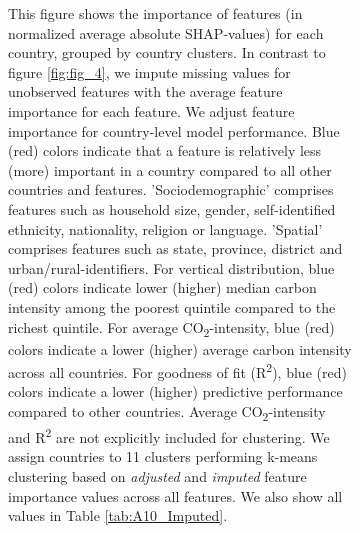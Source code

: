 \begin{figure}[ht!]
\begin{subfigure}[b]{\textwidth}
\begin{subcaption2}
    This figure shows the importance of features (in normalized average absolute SHAP-values) for each country, grouped by country clusters. In contrast to figure \ref{fig:fig_4}, we impute missing values for unobserved features with the average feature importance for each feature. We adjust feature importance for country-level model performance. Blue (red) colors indicate that a feature is relatively less (more) important in a country compared to all other countries and features. 'Sociodemographic' comprises features such as household size, gender, self-identified ethnicity, nationality, religion or language. 'Spatial' comprises features such as state, province, district and urban/rural-identifiers. For vertical distribution, blue (red) colors indicate lower (higher) median carbon intensity among the poorest quintile compared to the richest quintile. For average CO\textsubscript{2}-intensity, blue (red) colors indicate a lower (higher) average carbon intensity across all countries. For goodness of fit (R\textsuperscript{2}), blue (red) colors indicate a lower (higher) predictive performance compared to other countries. Average CO\textsubscript{2}-intensity and R\textsuperscript{2} are not explicitly included for clustering.
    We assign countries to 11 clusters performing k-means clustering based on \textit{adjusted} and \textit{imputed} feature importance values across all features. We also show all values in Table \ref{tab:A10_Imputed}.
    \end{subcaption2}
    \end{subfigure}
    
\end{figure}
\clearpage